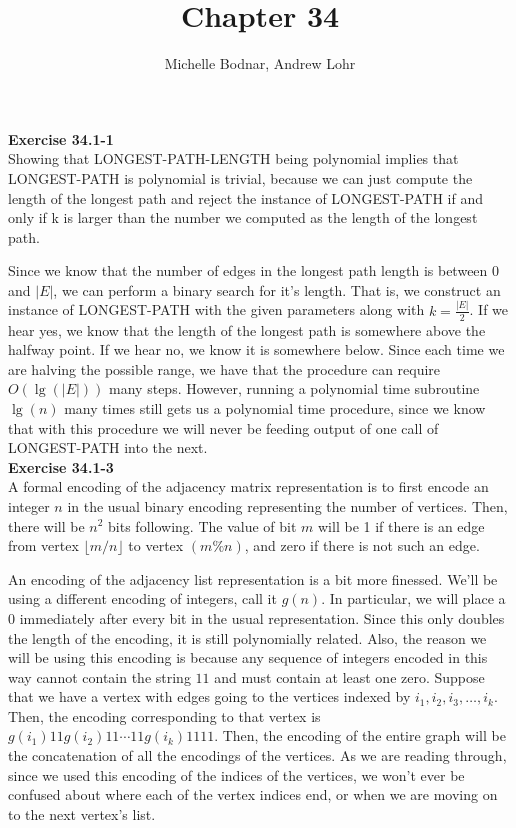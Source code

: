 \documentclass{article}
\title{Chapter 34}
\author{Michelle Bodnar, Andrew Lohr}
\begin{document}
\maketitle

\noindent\textbf{Exercise 34.1-1}\\

Showing that LONGEST-PATH-LENGTH being polynomial implies that LONGEST-PATH is polynomial is trivial, because we can just compute the length of the longest path and reject the instance of LONGEST-PATH if and only if k is larger than the number we computed as the length of the longest path.

Since we know that the number of edges in the longest path length is between $0$ and $|E|$, we can perform a binary search for it's length. That is, we construct an instance of LONGEST-PATH with the given parameters along with $k = \frac{|E|}{2}$. If we hear yes, we know that the length of the longest path is somewhere above the halfway point. If we hear no, we know it is somewhere below. Since each time we are halving the possible range, we have that the procedure can require $O(\lg(|E|))$ many steps. However, running a polynomial time subroutine $\lg(n)$ many times still gets us a polynomial time procedure, since we know that with this procedure we will never be feeding output of one call of LONGEST-PATH into the next.\\



\noindent\textbf{Exercise 34.1-3}\\

A formal encoding of the adjacency matrix representation is to first encode an integer $n$ in the usual binary encoding representing the number of vertices. Then, there will be $n^2$ bits following. The value of bit $m$ will be 1 if there is an edge from vertex $\lfloor m/n \rfloor$ to vertex $(m\%n)$, and zero if there is not such an edge.

An encoding of the adjacency list representation is a bit more finessed. We'll be using a different encoding of integers, call it $g(n)$. In particular, we will place a 0 immediately after every bit in the usual representation. Since this only doubles the length of the encoding, it is still polynomially related. Also, the reason we will be using this encoding is because any sequence of integers encoded in this way cannot contain the string $11$ and must contain at least one zero. Suppose that we have a vertex with edges going to the vertices indexed by $i_1,i_2,i_3,\ldots, i_k$. Then, the encoding corresponding to that vertex is $g(i_1)11g(i_2)11 \cdots 11g(i_k)1111$. Then, the encoding of the entire graph will be the concatenation of all the encodings of the vertices. As we are reading through, since we used this encoding of the indices of the vertices, we won't ever be confused about where each of the vertex indices end, or when we are moving on to the next vertex's list.
\end{document}

